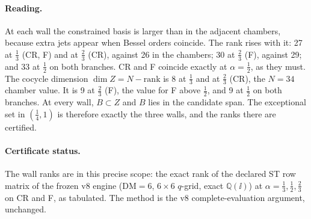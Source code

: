 \paragraph{Reading.} At each wall the constrained basis is larger
than in the adjacent chambers, because extra jets appear when Bessel
orders coincide. The rank rises with it: 27 at \(\tfrac13\) (CR, F)
and at \(\tfrac23\) (CR), against 26 in the chambers; 30 at
\(\tfrac23\) (F), against 29; and 33 at \(\tfrac12\) on both
branches. CR and F coincide exactly at \(\alpha=\tfrac12\), as they
must. The cocycle dimension \(\dim Z=N-\mathrm{rank}\) is 8 at
\(\tfrac13\) and at \(\tfrac23\) (CR), the \(N=34\) chamber value.
It is 9 at \(\tfrac23\) (F), the value for F above \(\tfrac12\), and
9 at \(\tfrac12\) on both branches. At every wall, \(B\subset Z\)
and \(B\) lies in the candidate span. The exceptional set in
\((\tfrac14,1)\) is therefore exactly the three walls, and the ranks
there are certified.

\paragraph{Certificate status.} The wall ranks are
\CPIR{} in this precise scope: the exact rank of the declared ST row
matrix of the frozen v8 engine (\(\mathrm{DM}=6\), \(6\times6\)
\(q\)-grid, exact \(\mathbb Q(\ii)\)) at \(\alpha=\tfrac13,\tfrac12,\tfrac23\)
on CR and F, as tabulated. The method is the v8 complete-evaluation
argument, unchanged.
